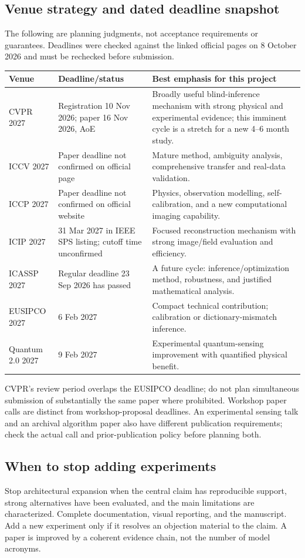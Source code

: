 \subsection{Venue strategy and dated deadline snapshot}
The following are planning judgments, not acceptance requirements or guarantees. Deadlines were checked against the linked official pages on 8 October 2026 and must be rechecked before submission.
\begin{longtable}{P{27mm}P{54mm}P{70mm}}
\toprule Venue & Deadline/status & Best emphasis for this project\\\midrule\endhead
CVPR 2027 & Registration 10 Nov 2026; paper 16 Nov 2026, AoE~\cite{cvpr} & Broadly useful blind-inference mechanism with strong physical and experimental evidence; this imminent cycle is a stretch for a new 4--6 month study.\\
ICCV 2027 & Paper deadline not confirmed on official page~\cite{iccv} & Mature method, ambiguity analysis, comprehensive transfer and real-data validation.\\
ICCP 2027 & Paper deadline not confirmed on official website~\cite{iccp} & Physics, observation modelling, self-calibration, and a new computational imaging capability.\\
ICIP 2027 & 31 Mar 2027 in IEEE SPS listing; cutoff time unconfirmed~\cite{icip} & Focused reconstruction mechanism with strong image/field evaluation and efficiency.\\
ICASSP 2027 & Regular deadline 23 Sep 2026 has passed~\cite{icassp} & A future cycle: inference/optimization method, robustness, and justified mathematical analysis.\\
EUSIPCO 2027 & 6 Feb 2027~\cite{eusipco} & Compact technical contribution; calibration or dictionary-mismatch inference.\\
Quantum 2.0 2027 & 9 Feb 2027~\cite{quantum} & Experimental quantum-sensing improvement with quantified physical benefit.\\\bottomrule
\end{longtable}
CVPR's review period overlaps the EUSIPCO deadline; do not plan simultaneous submission of substantially the same paper where prohibited. Workshop paper calls are distinct from workshop-proposal deadlines. An experimental sensing talk and an archival algorithm paper also have different publication requirements; check the actual call and prior-publication policy before planning both.

\subsection{When to stop adding experiments}
Stop architectural expansion when the central claim has reproducible support, strong alternatives have been evaluated, and the main limitations are characterized. Complete documentation, visual reporting, and the manuscript. Add a new experiment only if it resolves an objection material to the claim. A paper is improved by a coherent evidence chain, not the number of model acronyms.

